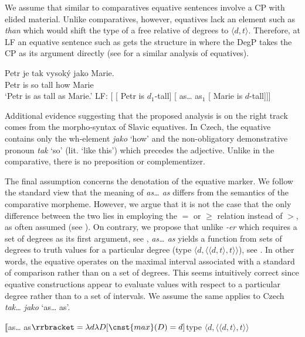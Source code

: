 \documentclass[output=paper,modfonts,hidelinks,newtxmath
\ChapterDOI{10.5281/zenodo.2545513}
]{langscibook}
\begin{document}
\noindent We assume that similar to comparatives equative sentences involve a CP with elided material. Unlike comparatives, however, equatives lack an element such as \textit{than} which would shift the type of a free relative of degrees to $\langle d,t\rangle$. Therefore, at LF an equative sentence such as  gets the structure in  where the DegP takes the CP as its argument directly (see \citealt{gobeski_morzycki2017percentages} for a similar analysis of equatives).

\ea \ea \gll Petr je tak vysoký jako Marie.\label{eq}\\
Petr is so tall how Marie\\
\glt `Petr is as tall as Marie.'
\ex LF: [ [ Petr is $d_1$-tall] [ as\dots{} as$_1$ [ Marie is $d$-tall]]]\label{eq-LF}
\z \z

\noindent Additional evidence suggesting that the proposed analysis is on the right track comes from the morpho-syntax of Slavic equatives. In Czech, the equative contains only the wh-element \textit{jako} `how' and the non-obligatory demonstrative pronoun \textit{tak} `so' (lit. `like this') which precedes the adjective. Unlike in the comparative, there is no preposition or complementizer. 

The final assumption concerns the denotation of the equative marker. We follow the standard view that the meaning of \textit{as\dots{} as} differs from the semantics of the comparative morpheme. However, we argue that it is not the case that the only difference between the two lies in employing the $=$ or $\geq$ relation instead of $>$, as often assumed (see \citealt{rett_measure_2015}). On contrary, we propose that unlike \textit{-er} which requires a set of degrees as its first argument, see , \textit{as\dots{} as} yields a function from sets of degrees to truth values for a particular degree (type $\langle d,\langle \langle d,t\rangle,t\rangle\rangle$), see . In other words, the equative operates on the maximal interval associated with a standard of comparison rather than on a set of degrees. This seems intuitively correct since equative constructions appear to evaluate values with respect to a particular degree rather than to a set of intervals. We assume the same applies to Czech \textit{tak\dots{} jako} `as\dots{} as'.

\ea $\llbracket$as{\dots} as$\rrbracket = \lambda d\lambda D[\cnst{max}(D) = d]$\hfill type $\langle d,\langle \langle d,t\rangle,t\rangle\rangle$\label{as-as-semantics}
\z
\end{document}
